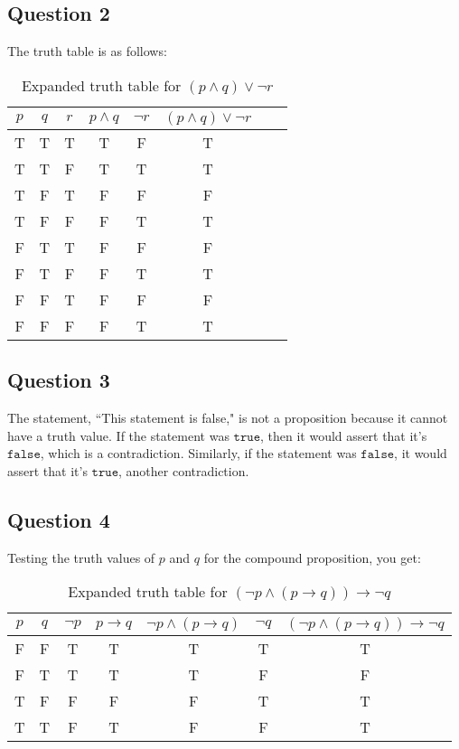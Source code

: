 \documentclass[letterpaper, 12pt]{article}
\begin{document}
\subsection*{Question 2}
The truth table is as follows:
\begin{table}[H]
\centering
    \begin{tabular}{|c c c|c|c|c|c|c|}
    \hline
    $p$ & $q$ & $r$ & $p \land q$ & $\neg r$ & $(p \land q) \lor \neg r$ \\ \hline
    T & T & T & T & F & T\\ \hline
    T & T & F & T & T & T\\ \hline
    T & F & T & F & F & F\\ \hline
    T & F & F & F & T & T\\ \hline
    F & T & T & F & F & F\\ \hline
    F & T & F & F & T & T\\ \hline
    F & F & T & F & F & F\\ \hline
    F & F & F & F & T & T\\ \hline
    \end{tabular}
    \caption{Expanded truth table for $(p \land q) \lor \neg r$}
    \label{table:1}
\end{table}

\subsection*{Question 3}
The statement, ``This statement is false," is not a proposition because it cannot have a truth value. If the statement was $\texttt{true}$, then it would assert that it's $\texttt{false}$, which is a contradiction. Similarly, if the statement was $\texttt{false}$, it would assert that it's $\texttt{true}$, another contradiction.

\subsection*{Question 4}
Testing the truth values of $p$ and $q$ for the compound proposition, you get:

\begin{table}[H]
\centering
    \begin{tabular}{|c c|c|c|c|c|c|}
    \hline
    $p$ & $q$ & $\neg p$ & $p \to q$ & $\neg p \land (p \to q)$ & $\neg q$ & $(\neg p \land (p \to q)) \to \neg q$\\ \hline
    F & F & T & T & T & T & T\\ \hline
    F & T & T & T & T & F & F\\ \hline
    T & F & F & F & F & T & T\\ \hline
    T & T & F & T & F & F & T\\ \hline
    \end{tabular}
    \caption{Expanded truth table for $(\neg p \land (p \to q)) \to \neg q$}
    \label{table:2}
\end{table}
\end{document}
